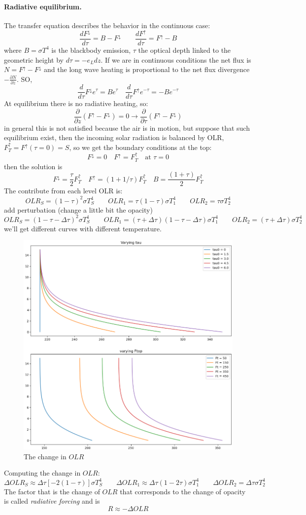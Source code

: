 \paragraph{Radiative equilibrium.} The transfer equation describes the behavior in the continuous case: 
$$\frac{dF^{\downarrow}}{d\tau}=B-F^{\downarrow} \qquad  \frac{dF^{\uparrow}}{d\tau}=F^{\uparrow}-B$$
where $B=\sigma T^4$ is the blackbody emission, $\tau$ the optical depth linked to the geometric height by $d\tau=-e_Ldz$. If we are in continuous conditions the net flux is $N=F^{\uparrow}-F^{\downarrow}$ and the long wave heating is proportional to the net flux divergence $-\frac{\partial N}{\partial z}$. SO, 
$$\frac{d}{d\tau}F^{\downarrow}e^{\tau}=Be^{\tau}\quad \frac{d}{d\tau}F^{\uparrow}e^{-\tau}=-Be^{-\tau}$$
At equilibrium there is no radiative heating, so:
$$\frac{\partial}{\partial z}(F^{\uparrow}-F^{\downarrow})=0\rightarrow\frac{\partial}{\partial\tau}(F^{\uparrow}-F^{\downarrow})$$
in general this is not satisfied because the air is in motion, but suppose that such equilibrium exist, then the incoming solar radiation is balanced by OLR, $F^{\uparrow}_T=F^{\uparrow}(\tau=0)=S$, so we get the boundary conditions at the top:
$$F^{\downarrow}=0 \quad F^{\uparrow}=F^{\uparrow}_T \quad \text{at} \, \, \tau=0$$
then the solution is 
$$F^{\downarrow}=\frac{\tau}{2}F^{\uparrow}_T \quad F^{\uparrow}=(1+1/\tau )F^{\uparrow}_T \quad B=\frac{(1+\tau)}{2}F^{\uparrow}_T $$
The contribute from each level OLR is:
$$OLR_S=(1-\tau)^2\sigma T^4_S \qquad OLR_1=\tau(1-\tau)\sigma T_1^4 \qquad OLR_2=\tau\sigma T_2^4$$
add perturbation (change a little bit the opacity)
$$OLR_S=(1-\tau-\Delta\tau)^2\sigma T^4_S \qquad OLR_1=(\tau+\Delta\tau)(1-\tau-\Delta\tau)\sigma T_1^4 \qquad OLR_2=(\tau+\Delta\tau)\sigma T_2^4$$
we'll get different curves with different temperature.
\begin{figure}[h!]
    \centering
    \includegraphics[width=0.5\linewidth]{uploads/Screenshot 2024-11-20 125556.png}
    \caption{The change in $OLR$}
    \label{fig:enter-label}
\end{figure}
Computing the change in $OLR$:
$$\Delta OLR_S\approx\Delta\tau[-2(1-\tau)]\sigma T_S^4 \qquad \Delta OLR_1\approx\Delta\tau(1-2\tau)\sigma T_1^4 \qquad \Delta OLR_2=\Delta\tau\sigma T_2^4$$
The factor that is the change of $OLR$ that corresponds to the change of opacity is called \textit{radiative forcing} and is 
\begin{equation}\label{eq.radiative forcing}
    R\approx-\Delta OLR
\end{equation}
